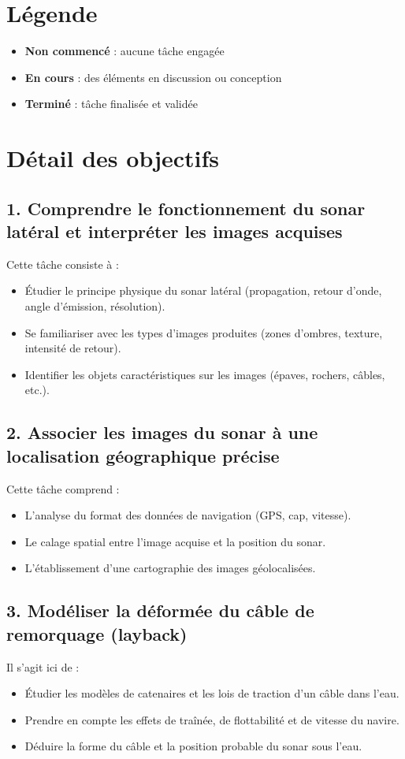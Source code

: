 \documentclass[a4paper,11pt]{article}
\begin{document}
\section*{Légende}
\begin{itemize}[label=\textbullet]
  \item \textbf{Non commencé} : aucune tâche engagée
  \item \textbf{En cours} : des éléments en discussion ou conception
  \item \textbf{Terminé} : tâche finalisée et validée
\end{itemize}

\newpage

\section*{Détail des objectifs}

\subsection*{1. Comprendre le fonctionnement du sonar latéral et interpréter les images acquises}
Cette tâche consiste à :
\begin{itemize}
  \item Étudier le principe physique du sonar latéral (propagation, retour d’onde, angle d’émission, résolution).
  \item Se familiariser avec les types d’images produites (zones d’ombres, texture, intensité de retour).
  \item Identifier les objets caractéristiques sur les images (épaves, rochers, câbles, etc.).
\end{itemize}

\subsection*{2. Associer les images du sonar à une localisation géographique précise}
Cette tâche comprend :
\begin{itemize}
  \item L’analyse du format des données de navigation (GPS, cap, vitesse).
  \item Le calage spatial entre l’image acquise et la position du sonar.
  \item L’établissement d’une cartographie des images géolocalisées.
\end{itemize}

\subsection*{3. Modéliser la déformée du câble de remorquage (layback)}
Il s’agit ici de :
\begin{itemize}
  \item Étudier les modèles de catenaires et les lois de traction d’un câble dans l’eau.
  \item Prendre en compte les effets de traînée, de flottabilité et de vitesse du navire.
  \item Déduire la forme du câble et la position probable du sonar sous l’eau.
\end{itemize}
\end{document}
